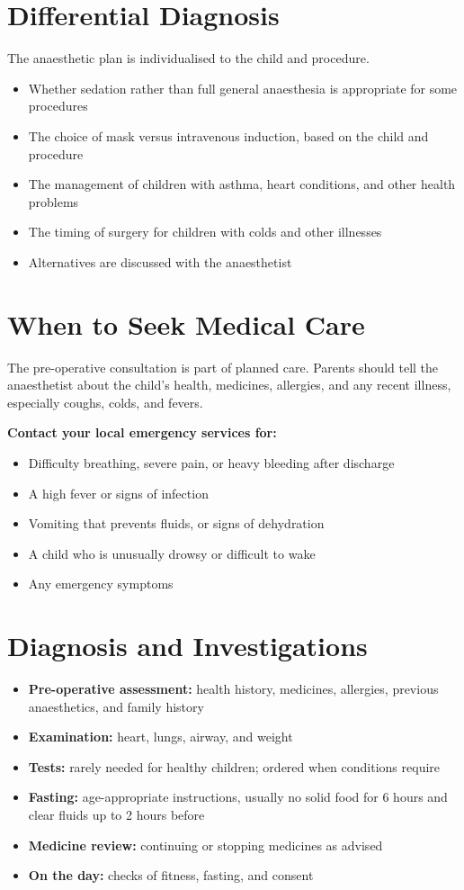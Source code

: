 \section*{Differential Diagnosis}
The anaesthetic plan is individualised to the child and procedure.
\begin{itemize}
    \item Whether sedation rather than full general anaesthesia is appropriate for some procedures
    \item The choice of mask versus intravenous induction, based on the child and procedure
    \item The management of children with asthma, heart conditions, and other health problems
    \item The timing of surgery for children with colds and other illnesses
    \item Alternatives are discussed with the anaesthetist
\end{itemize}

\section*{When to Seek Medical Care}
The pre-operative consultation is part of planned care. Parents should tell the anaesthetist about the child's health, medicines, allergies, and any recent illness, especially coughs, colds, and fevers.

\textbf{Contact your local emergency services for:}
\begin{itemize}
    \item Difficulty breathing, severe pain, or heavy bleeding after discharge
    \item A high fever or signs of infection
    \item Vomiting that prevents fluids, or signs of dehydration
    \item A child who is unusually drowsy or difficult to wake
    \item Any emergency symptoms
\end{itemize}

\section*{Diagnosis and Investigations}
\begin{itemize}
    \item \textbf{Pre-operative assessment:} health history, medicines, allergies, previous anaesthetics, and family history
    \item \textbf{Examination:} heart, lungs, airway, and weight
    \item \textbf{Tests:} rarely needed for healthy children; ordered when conditions require
    \item \textbf{Fasting:} age-appropriate instructions, usually no solid food for 6 hours and clear fluids up to 2 hours before
    \item \textbf{Medicine review:} continuing or stopping medicines as advised
    \item \textbf{On the day:} checks of fitness, fasting, and consent
\end{itemize}

